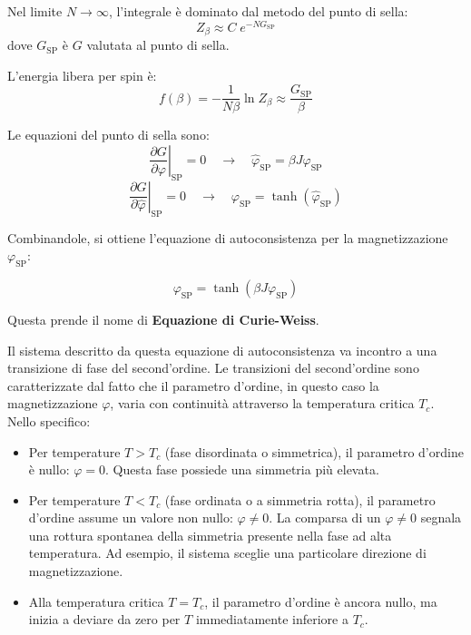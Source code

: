Nel limite $N\rightarrow\infty$, l'integrale è dominato dal metodo del punto di sella:
\begin{equation}
Z_{\beta} \approx C \; e^{-NG_{\text{SP}}}
\end{equation}
dove $G_{\text{SP}}$ è $G$ valutata al punto di sella.

L'energia libera per spin è:
\begin{equation} 
f(\beta) = -\frac{1}{N\beta}\ln Z_{\beta} \approx \frac{G_{\text{SP}}}{\beta} 
\end{equation}

Le equazioni del punto di sella sono:
\begin{equation} 
\left. \frac{\partial G}{\partial\varphi}\right|_{\text{SP}}=0 \quad \longrightarrow \quad \hat{\varphi}_{\text{SP}}=\beta J \varphi_{\text{SP}} 
\end{equation}
\begin{equation} 
\left. \frac{\partial G}{\partial\hat{\varphi}}\right|_{\text{SP}}=0 \quad \longrightarrow \quad \varphi_{\text{SP}} = \tanh(\hat{\varphi}_{\text{SP}}) 
\end{equation}

Combinandole, si ottiene l'equazione di autoconsistenza per la magnetizzazione $\varphi_{\text{SP}}$:
\begin{tcolorbox}[
    colback=colorA!5,      
    colframe=colorA,       
    arc=3mm,               
    boxrule=1.2pt
]
\begin{equation}
\varphi_{\text{SP}} = \tanh(\beta J\varphi_{\text{SP}})
\end{equation}
\end{tcolorbox}
Questa prende il nome di \textbf{Equazione di Curie-Weiss}.

Il sistema descritto da questa equazione di autoconsistenza va incontro a una transizione di fase del second'ordine. Le transizioni del second'ordine sono caratterizzate dal fatto che il parametro d'ordine, in questo caso la magnetizzazione $\varphi$, varia con continuità attraverso la temperatura critica $T_c$. Nello specifico:
\begin{itemize}
    \item Per temperature $T > T_c$ (fase disordinata o simmetrica), il parametro d'ordine è nullo: $\varphi = 0$. Questa fase possiede una simmetria più elevata.
    \item Per temperature $T < T_c$ (fase ordinata o a simmetria rotta), il parametro d'ordine assume un valore non nullo: $\varphi \neq 0$. La comparsa di un $\varphi \neq 0$ segnala una rottura spontanea della simmetria presente nella fase ad alta temperatura. Ad esempio, il sistema sceglie una particolare direzione di magnetizzazione.

\item Alla temperatura critica $T = T_c$, il parametro d'ordine è ancora nullo, ma inizia a deviare da zero per $T$ immediatamente inferiore a $T_c$.
\end{itemize}

